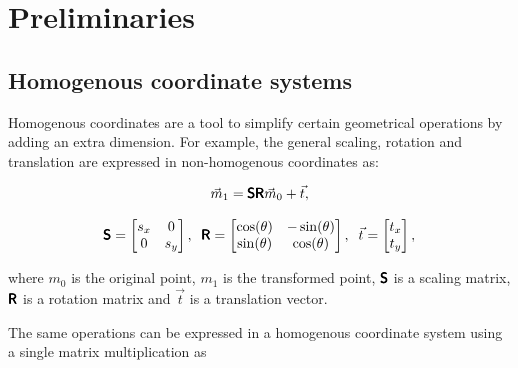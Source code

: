 \chapter{Preliminaries}

\label{chapter:preliminaries}
\section{Homogenous coordinate systems}

Homogenous coordinates are a tool to simplify certain geometrical operations by adding an extra dimension.
For example, the general scaling, rotation and translation are expressed in non-homogenous coordinates as:

\begin{equation}
    \vec{m}_1 = 
    \pmb{\mathsf{S}} \pmb{\mathsf{R}}
    \vec{m}_0
    + \vec{t},
\end{equation}

\begin{equation}
    \pmb{\mathsf{S}} = \begin{bmatrix} s_x & 0 \\ 0 & s_y \end{bmatrix}, \;\; 
    \pmb{\mathsf{R}} = \begin{bmatrix} \cos(\theta) & -\sin(\theta) \\ \sin(\theta) & \cos(\theta) \end{bmatrix}, \;\;
    \vec{t} = \begin{bmatrix} t_x \\ t_y \end{bmatrix},
\end{equation}

where $m_0$ is the original point,
$m_1$ is the transformed point, 
$\pmb{\mathsf{S}}$ is a scaling matrix,
$\pmb{\mathsf{R}}$ is a rotation matrix and 
$\vec{t}$ is a translation vector.

The same operations can be expressed in a homogenous coordinate system using a single matrix multiplication as


